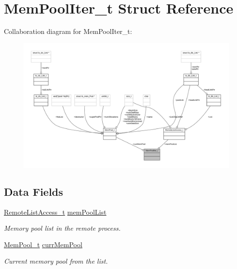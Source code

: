 \hypertarget{struct_mem_pool_iter__t}{}\section{Mem\+Pool\+Iter\+\_\+t Struct Reference}
\label{struct_mem_pool_iter__t}


Collaboration diagram for Mem\+Pool\+Iter\+\_\+t\+:
\nopagebreak
\begin{figure}[H]
\begin{center}
\leavevmode
\includegraphics[width=350pt]{struct_mem_pool_iter__t__coll__graph}
\end{center}
\end{figure}
\subsection*{Data Fields}
\begin{DoxyCompactItemize}
\item 
\hyperlink{struct_remote_list_access__t}{Remote\+List\+Access\+\_\+t} \hyperlink{struct_mem_pool_iter__t_abc276e0a6f52d6f27628c8d5a5a5268b}{mem\+Pool\+List}
\begin{DoxyCompactList}\small\item\em Memory pool list in the remote process. \end{DoxyCompactList}\item 
\hyperlink{struct_mem_pool__t}{Mem\+Pool\+\_\+t} \hyperlink{struct_mem_pool_iter__t_a8c2dcace3eddd0b79f679e7033a63f78}{curr\+Mem\+Pool}
\begin{DoxyCompactList}\small\item\em Current memory pool from the list. \end{DoxyCompactList}\end{DoxyCompactItemize}


